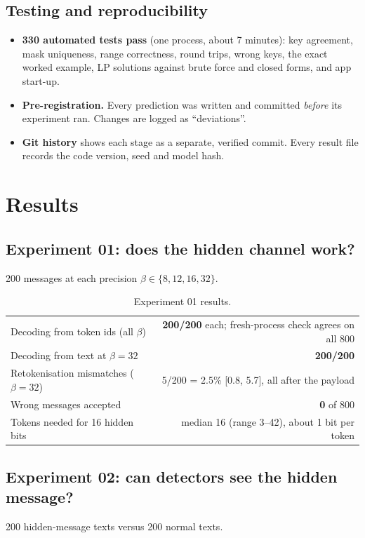 \documentclass[11pt,a4paper]{article}
\begin{document}
\subsection{Testing and reproducibility}
\begin{itemize}
  \item \textbf{330 automated tests pass} (one process, about 7 minutes): key agreement, mask uniqueness, range correctness, round trips, wrong keys, the exact worked example, LP solutions against brute force and closed forms, and app start-up.
  \item \textbf{Pre-registration.} Every prediction was written and committed \emph{before} its experiment ran. Changes are logged as ``deviations''.
  \item \textbf{Git history} shows each stage as a separate, verified commit. Every result file records the code version, seed and model hash.
\end{itemize}

\section{Results}
\subsection{Experiment 01: does the hidden channel work?}
200 messages at each precision $\beta \in \{8, 12, 16, 32\}$.

\begin{table}[H]\centering
\caption{Experiment 01 results.}
\begin{tabular}{lr}
\toprule
Decoding from token ids (all $\beta$) & \textbf{200/200} each; fresh-process check agrees on all 800\\
Decoding from text at $\beta=32$ & \textbf{200/200}\\
Retokenisation mismatches ($\beta=32$) & 5/200 = 2.5\% [0.8, 5.7], all after the payload\\
Wrong messages accepted & \textbf{0} of 800\\
Tokens needed for 16 hidden bits & median 16 (range 3--42), about 1 bit per token\\
\bottomrule
\end{tabular}
\end{table}

\subsection{Experiment 02: can detectors see the hidden message?}
200 hidden-message texts versus 200 normal texts.
\end{document}
